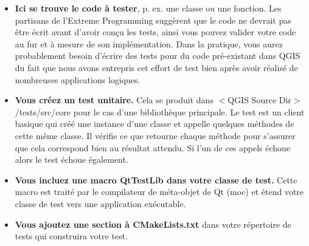 \begin{itemize}
\item \textbf{Ici se trouve le code à tester}, p. ex. une classe ou une fonction. Les partisans de l'Extreme Programming suggèrent que le code ne devrait pas être écrit avant d'avoir conçu les tests, ainsi vous pouvez valider votre code au fur et  à mesure de son implémentation. Dans la pratique, vous aurez probablement besoin d'écrire des tests pour du code pré-existant dans QGIS du fait que nous avons entrepris cet effort de test bien après avoir réalisé de nombreuses applications logiques.

\item \textbf{Vous créez un test unitaire.} Cela se produit dans $<$QGIS Source Dir$>$/tests/src/core pour le cas d'une bibliothèque principale. Le test est un client basique qui créé une instance d'une classe et appelle quelques méthodes de cette même classe. Il vérifie ce que retourne chaque méthode pour s'assurer que cela correspond bien au résultat attendu. Si l'un de ces appels échoue alors le test échoue également.

\item \textbf{Vous incluez une macro QtTestLib dans votre classe de test.} Cette macro est traité par le compilateur de méta-objet de Qt (moc) et étend votre classe de test vers une application exécutable.

% 
% 
% 
% 
\item \textbf{Vous ajoutez une section à CMakeLists.txt} dans votre répertoire de tests qui construira votre test.


\end{itemize}

